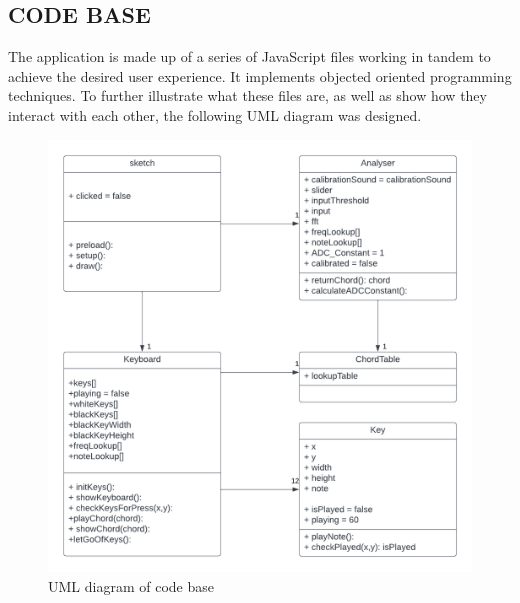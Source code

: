 \documentclass[12pt,a4paper]{article}
\begin{document}
	\subsection{CODE BASE}
			The application is made up of a series of JavaScript files working in tandem to achieve the desired user experience. It implements objected oriented programming techniques. 
			To further illustrate what these files are, as well as show how they interact with each other, the following UML diagram was designed.\\
			\begin{figure}
				\begin{center}
					\includegraphics[width=\linewidth]{UML}
				\end{center}
				\caption{UML diagram of code base}
			\end{figure}

\newpage
\vspace*{5mm}
\end{document}
